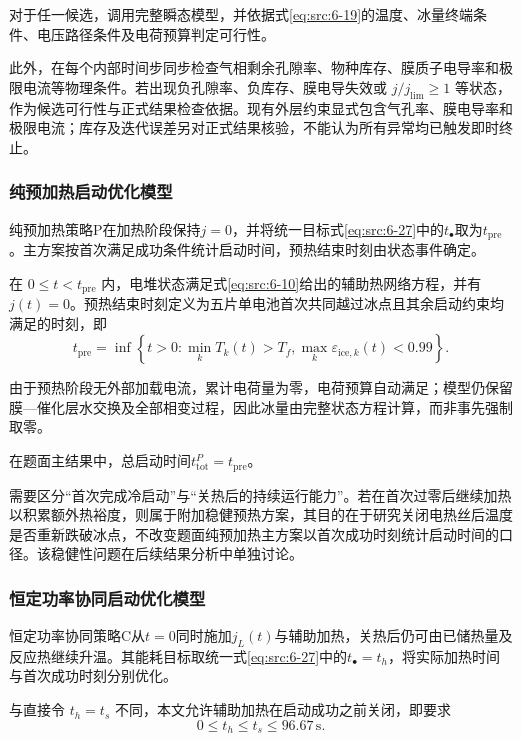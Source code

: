 \documentclass[bwprint]{gmcmthesis}
\numberwithin{equation}{section}
\numberwithin{figure}{section}
\begin{document}
 对于任一候选，调用完整瞬态模型，并依据式\eqref{eq:src:6-19}的温度、冰量终端条件、电压路径条件及电荷预算判定可行性。

 此外，在每个内部时间步同步检查气相剩余孔隙率、物种库存、膜质子电导率和极限电流等物理条件。若出现负孔隙率、负库存、膜电导失效或 \(j/j_{\lim}\ge1\) 等状态，作为候选可行性与正式结果检查依据。现有外层约束显式包含气孔率、膜电导率和极限电流；库存及迭代误差另对正式结果核验，不能认为所有异常均已触发即时终止。
\subsubsection{纯预加热启动优化模型}

 纯预加热策略P在加热阶段保持$j=0$，并将统一目标式\eqref{eq:src:6-27}中的$t_\bullet$取为$t_{\mathrm{pre}}$。主方案按首次满足成功条件统计启动时间，预热结束时刻由状态事件确定。

 在 \(0 \leq t < t_{\text{pre}}\) 内，电堆状态满足式\eqref{eq:src:6-10}给出的辅助热网络方程，并有 \(j(t) = 0\)。预热结束时刻定义为五片单电池首次共同越过冰点且其余启动约束均满足的时刻，即
\begin{equation}
t_{\text{pre}} = \inf \left\{ t > 0 : \min_k T_k(t) > T_f, \max_k \varepsilon_{\text{ice},k}(t) < 0.99 \right\}. \label{eq:src:6-31}
\end{equation}

 由于预热阶段无外部加载电流，累计电荷量为零，电荷预算自动满足；模型仍保留膜—催化层水交换及全部相变过程，因此冰量由完整状态方程计算，而非事先强制取零。

 在题面主结果中，总启动时间$t_{\mathrm{tot}}^P=t_{\mathrm{pre}}$。

 需要区分“首次完成冷启动”与“关热后的持续运行能力”。若在首次过零后继续加热以积累额外热裕度，则属于附加稳健预热方案，其目的在于研究关闭电热丝后温度是否重新跌破冰点，不改变题面纯预加热主方案以首次成功时刻统计启动时间的口径。该稳健性问题在后续结果分析中单独讨论。

\subsubsection{恒定功率协同启动优化模型}

 恒定功率协同策略C从$t=0$同时施加$j_L(t)$与辅助加热，关热后仍可由已储热量及反应热继续升温。其能耗目标取统一式\eqref{eq:src:6-27}中的$t_\bullet=t_h$，将实际加热时间与首次成功时刻分别优化。

 与直接令 \(t_h = t_s\) 不同，本文允许辅助加热在启动成功之前关闭，即要求
\begin{equation}
0 \leq t_h \leq t_s \leq 96.67 \, \text{s}. \label{eq:src:6-34}
\end{equation}
\end{document}
